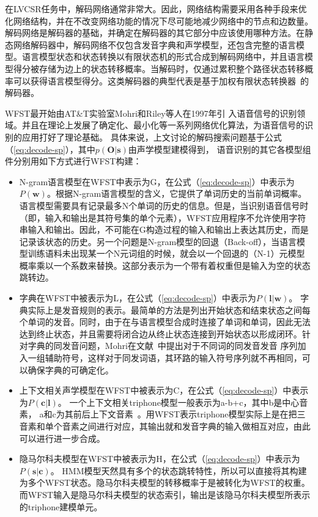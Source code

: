 在LVCSR任务中，解码网络通常非常大。因此，网络结构需要采用各种手段来优化网络结构，并在不改变网络功能的情况下尽可能地减少网络中的节点和边数量。解码网络是解码器的基础，并确定在解码器的其它部分中应该使用哪种方法。在静态网络解码器中，解码网络不仅包含发音字典和声学模型，还包含完整的语言模型。语言模型状态和状态转换以有限状态机的形式合成到解码网络中，并且语言模型得分被存储为边上的状态转移概率。当解码时，仅通过累积整个路径状态转移概率可以获得语言模型得分。这类解码器的典型代表是基于加权有限状态转换器~\cite{mohri2002weighted}的解码器。

WFST最开始由AT\&T实验室Mohri和Riley等人在1997年引
入语音信号的识别领域。并且在理论上发展了确定化、最小化等一系列网络优化算法，为语音信号的识别的应用打好了理论基础。
具体来说，上文讨论的解码搜索问题基于公式（\ref{eq:decode-sp}），其中$p(\mathbf{O}|\mathbf{s})$由声学模型建模得到，
语音识别的其它各模型组件分别用如下方式进行WFST构建：

\begin{itemize}
\item N-gram语言模型在WFST中表示为G，在公式（\ref{eq:decode-sp}）中表示为$P(\mathbf{w})$。根据N-gram语言模型的含义，它提供了单词历史的当前单词概率。语言模型需要具有记录最多N个单词的历史的信息。但是，当识别语音信号时（即，输入和输出是其符号集的单个元素），WFST应用程序不允许使用字符串输入和输出。因此，不可能在G构造过程的输入和输出上表达其历史，而是记录该状态的历史。另一个问题是N-gram模型的回退（Back-off），当语言模型训练语料未出现某一个N元词组的时候，就会以一个回退的（N-1）元模型概率乘以一个系数来替换。这部分表示为一个带有着权重但是输入为空的状态跳转边。

\item 字典在WFST中被表示为L，在公式（\ref{eq:decode-sp}）中表示为$P(\mathbf{l}|\mathbf{w})$。
字典实际上是发音规则的表示。最简单的方法是列出开始状态和结束状态之间每个单词的发音。同时，由于在与语言模型合成时连接了单词和单词，因此无法达到终止状态，并且需要将闭合边从终止状态连接到开始状态以形成闭环。针对字典的同发音问题，Mohri在文献~\cite{mohri2002weighted}中提出对于不同词的同发音发音
序列加入一组辅助符号，这样对于同发词语，其环路的输入符号序列就不再相同，可以确保字典的可确定化。

\item 上下文相关声学模型在WFST中被表示为C，在公式（\ref{eq:decode-sp}）中表示为$P(\mathbf{c}|\mathbf{l})$。
一个上下文相关triphone模型一般表示为a-b+c，其中b是中心音素，
a和c为其前后上下文音素~\cite{seide2011conversational}。用WFST表示triphone模型实际上是在把三音素和单个音素之间进行对应，其输出就和发音字典的输入做相互对应，由此可以进行进一步合成。

\item 隐马尔科夫模型在WFST中被表示为H，在公式（\ref{eq:decode-sp}）中表示为$P(\mathbf{s}|\mathbf{c})$。
HMM模型天然具有多个的状态跳转特性，所以可以直接将其构建为多个WFST状态。隐马尔科夫模型的转移概率于是被转化为WFST的权重。而WFST输入是隐马尔科夫模型的状态索引，输出是该隐马尔科夫模型所表示的triphone建模单元。
\end{itemize}

